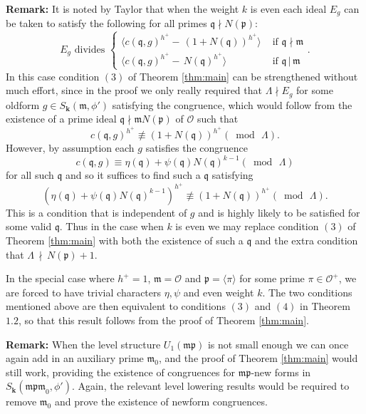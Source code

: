 \documentclass[a4paper,oneside]{amsart}
\theoremstyle{plain}
\theoremstyle{definition}
\begin{document}
\textbf{Remark:} It is noted by Taylor that when the weight $k$ is even each ideal $E_g$ can be taken to satisfy the following for all primes $\mathfrak{q}\nmid N(\mathfrak{p})$: \[ E_g \text{ divides } \begin{cases}
\langle c(\mathfrak{q},g)^{h^+} -\,(1+N(\mathfrak{q}))^{h^+}\rangle & \text{ if } \mathfrak{q}\nmid \mathfrak{m} \\
\langle c(\mathfrak{q},g)^{h^+}-\,N(\mathfrak{q})^{h^+}\rangle & \text{ if } \mathfrak{q}\,|\,\mathfrak{m}\end{cases}.\] 
In this case condition $(3)$ of Theorem \ref{thm:main} can be strengthened without much effort, since in the proof we only really required that $\Lambda\nmid E_g$ for some oldform $g\in S_{\textbf{k}}(\mathfrak{m},\phi')$ satisfying the congruence, which would follow from the existence of a prime ideal $\mathfrak{q}\nmid \mathfrak{m}N(\mathfrak{p})$ of $\mathcal{O}$ such that \[c(\mathfrak{q},g)^{h^+} \not\equiv (1+N(\mathfrak{q}))^{h^+} (\bmod \, \Lambda).\] However, by assumption each $g$ satisfies the congruence \[c(\mathfrak{q},g) \equiv \eta(\mathfrak{q}) + \psi(\mathfrak{q})N(\mathfrak{q})^{k-1} (\bmod \,\Lambda)\] for all such $\mathfrak{q}$ and so it suffices to find such a $\mathfrak{q}$ satisfying \[(\eta(\mathfrak{q})+\psi(\mathfrak{q})N(\mathfrak{q})^{k-1})^{h^+} \not\equiv (1 + N(\mathfrak{q}))^{h^+} (\bmod \,\Lambda).\] This is a condition that is independent of $g$ and is highly likely to be satisfied for some valid $\mathfrak{q}$. Thus in the case when $k$ is even we may replace condition $(3)$ of Theorem \ref{thm:main} with both the existence of such a $\mathfrak{q}$ and the extra condition that $\Lambda\,\nmid\, N(\mathfrak{p})+1$.

In the special case where $h^+=1$, $\mathfrak{m} = \mathcal{O}$ and $\mathfrak{p} = \langle \pi\rangle$ for some prime $\pi\in\mathcal{O}^+$, we are forced to have trivial characters $\eta,\psi$ and even weight $k$. The two conditions mentioned above are then equivalent to conditions $(3)$ and $(4)$ in Theorem $1.2$, so that this result follows from the proof of Theorem \ref{thm:main}.

\vspace{0.1in}
\textbf{Remark:} When the level structure $U_1(\mathfrak{mp})$ is not small enough we can once again add in an auxiliary prime $\mathfrak{m}_0$, and the proof of Theorem \ref{thm:main} would still work, providing the existence of congruences for $\mathfrak{mp}$-new forms in $S_{\textbf{k}}(\mathfrak{mpm}_0,\phi')$. Again, the relevant level lowering results would be required to remove $\mathfrak{m}_0$ and prove the existence of newform congruences.
\end{document}
